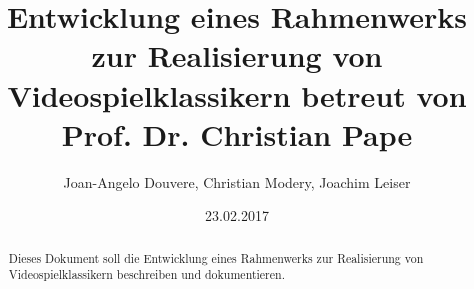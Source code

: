 \documentclass[a4paper, 11pt]{article}
\begin{document}
\author{Joan-Angelo Douvere, Christian Modery, Joachim Leiser}
\title{Entwicklung eines Rahmenwerks zur Realisierung von Videospielklassikern betreut von Prof. Dr. Christian Pape}
\date{23.02.2017}
\maketitle

\pagebreak

\begin{abstract}
        \noindent Dieses Dokument soll die Entwicklung eines Rahmenwerks zur Realisierung von Videospielklassikern beschreiben und dokumentieren.
\end{abstract}

\tableofcontents

\pagebreak









  

 

\newpage
{}


\end{document}
